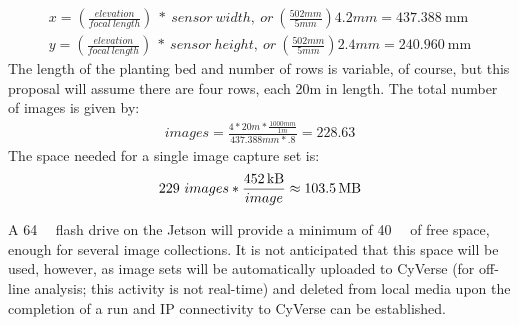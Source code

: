 \documentclass[12pt]{article}
\begin{document}
{\begin{align}
	x = \left( \frac {elevation} {focal\ length} \right) \ *\ sensor\ width,\ or\ \left( \frac {502mm} {5mm} \right) 4.2mm = \SI{437.388}{\milli\meter} \\
	y = \left( \frac {elevation} {focal\ length} \right) \ *\ sensor\ height,\ or\ \left( \frac {502mm} {5mm} \right) 2.4mm = \SI{240.960}{\milli\meter}
\end{align}
The length of the planting bed and number of rows is variable, of course, but this proposal will assume there are four rows, each 20m in length. The total number of images is given by:
\begin{align}
	images = \frac {4 * 20m * \frac{1000mm} {1m}} {437.388mm * .8} = 228.63
\end{align}
The space needed for a single image capture set is:
\begin{align}
229\ images * \frac{\SI{452}{\kilo\byte}} {image} \approx \SI{103.5}{\mega\byte}
\end{align}

A \SI{64}{\giga\byte} flash drive on the Jetson will provide a minimum of \SI{40}{\giga\byte} of free space, enough for several image collections. It is not anticipated that this space will be used, however, as image sets will be automatically uploaded to CyVerse (for off-line analysis; this activity is not real-time) and deleted from local media upon the completion of a run and IP connectivity to CyVerse can be established.

}
\end{document}
